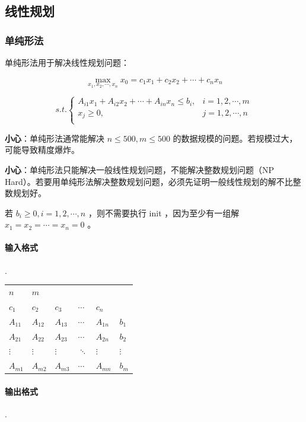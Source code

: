 \documentclass{article}
\begin{document}
\subsection{线性规划}

\subsubsection{单纯形法}

单纯形法用于解决线性规划问题：

$$
\max_{x_1, x_2, \cdots, x_n} x_0 = c_1x_1 + c_2x_2 + \cdots + c_nx_n
$$

$$
s.t.
\left\{
\begin{array}{ll}
A_{i1}x_1 + A_{i2}x_2 + \cdots + A_{in}x_n \leq b_i, & i = 1, 2, \cdots, m \\
x_j \geq 0, & j = 1, 2, \cdots, n \\
\end{array}
\right.
$$

\textbf{小心}：单纯形法通常能解决 $n \leq 500, m \leq 500$ 的数据规模的问题。若规模过大，可能导致精度爆炸。

\textbf{小心}：单纯形法只能解决一般线性规划问题，不能解决整数规划问题（NP Hard）。若要用单纯形法解决整数规划问题，必须先证明一般线性规划的解不比整数规划好。

若 $b_i \geq 0, i = 1, 2, \cdots, n$ ，则不需要执行 init ，因为至少有一组解 $x_1 = x_2 = \cdots = x_n = 0$ 。

\paragraph{输入格式} .

\begin{longtable}{llllll}
$n$ & $m$ & & & & \\
$c_1$ & $c_2$ & $c_3$ & $\cdots$ & $c_n$ & \\
$A_{11}$ & $A_{12}$ & $A_{13}$ & $\cdots$ & $A_{1n}$ & $b_1$ \\
$A_{21}$ & $A_{22}$ & $A_{23}$ & $\cdots$ & $A_{2n}$ & $b_2$ \\
$\vdots$ & $\vdots$ & $\vdots$ & $\ddots$ & $\vdots$ & $\vdots$ \\
$A_{m1}$ & $A_{m2}$ & $A_{m3}$ & $\cdots$ & $A_{mn}$ & $b_m$ \\
\end{longtable}

\paragraph{输出格式} .
\end{document}
